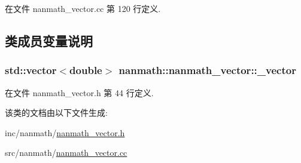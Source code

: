 在文件 nanmath\+\_\+vector.\+cc 第 120 行定义.



\subsection{类成员变量说明}
\hypertarget{classnanmath_1_1nanmath__vector_a94ec16545c93633be1f298646a2d65ec}{}
\subsubsection[{\+\_\+vector}]{\setlength{\rightskip}{0pt plus 5cm}std\+::vector$<$double$>$ nanmath\+::nanmath\+\_\+vector\+::\+\_\+vector\hspace{0.3cm}{\ttfamily [protected]}}\label{classnanmath_1_1nanmath__vector_a94ec16545c93633be1f298646a2d65ec}


在文件 nanmath\+\_\+vector.\+h 第 44 行定义.



该类的文档由以下文件生成\+:\begin{DoxyCompactItemize}
\item 
inc/nanmath/\hyperlink{nanmath__vector_8h}{nanmath\+\_\+vector.\+h}\item 
src/nanmath/\hyperlink{nanmath__vector_8cc}{nanmath\+\_\+vector.\+cc}\end{DoxyCompactItemize}
